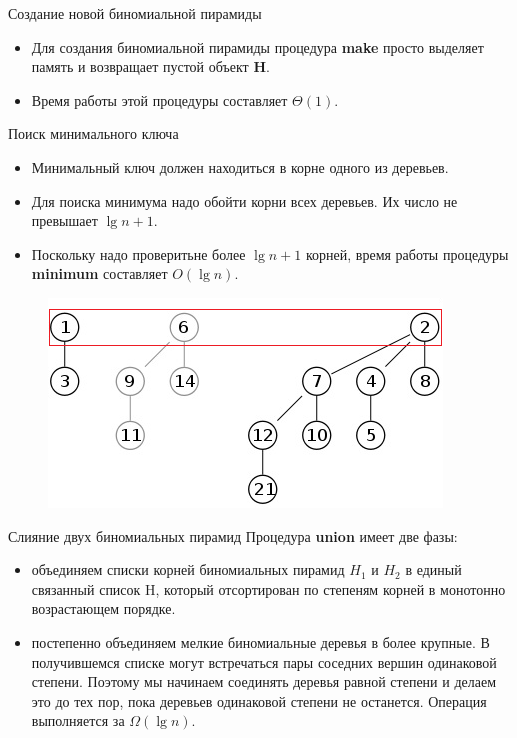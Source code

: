 \begin{frame}{Создание новой биномиальной пирамиды}
	\begin{itemize}
		\item Для создания биномиальной пирамиды процедура \textbf{make}
		просто выделяет память и возвращает пустой объект \textbf{H}.
		\item Время работы этой процедуры составляет $\Theta(1)$.
	\end{itemize}
\end{frame}

\begin{frame}{Поиск минимального ключа}
	\begin{itemize}
		\item Минимальный ключ должен находиться в корне одного из деревьев.
		\item Для поиска минимума надо обойти корни всех деревьев. Их число не превышает $\lg n + 1$.
		\item Поскольку надо проверитьне более $\lg n + 1$ корней, время работы процедуры
		\textbf{minimum} составляет $O(\lg n)$.
	\end{itemize}

	\begin{figure}
		\includegraphics[width=0.6\linewidth]{images/binom-heap-min.png}
	\end{figure}
\end{frame}

\begin{frame}{Слияние двух биномиальных пирамид}
	Процедура \textbf{union} имеет две фазы:
	\begin{itemize}
		\item объединяем списки корней биномиальных пирамид $H_1$ и $H_2$ в единый связанный список H, который
		отсортирован по степеням корней в монотонно возрастающем порядке.
		\item постепенно объединяем мелкие биномиальные деревья в более крупные.
		В получившемся списке могут встречаться пары соседних вершин одинаковой степени. 
		Поэтому мы начинаем соединять деревья равной степени и делаем это до тех пор, 
		пока деревьев одинаковой степени не останется. Операция выполняется за $\Omega(\lg n)$.
	\end{itemize}
\end{frame}


